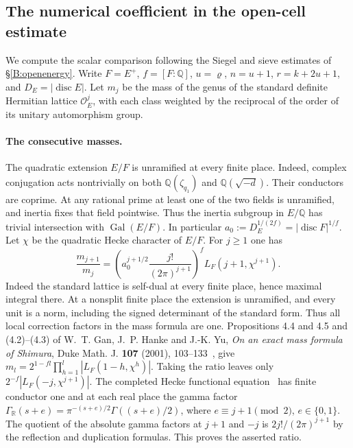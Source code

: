 \subsection{The numerical coefficient in the open-cell estimate}
\label{spread:normalization}
We compute the scalar comparison following the Siegel and sieve estimates of
\S\ref{B:openenergy}.  Write \(F=E^+\), \(f=[F:\mathbb Q]\),
\(u=\varrho\), \(n=u+1\), \(r=k+2u+1\), and \(D_E=|\operatorname{disc}E|\).
Let \(m_j\) be the mass of the genus of the standard definite
Hermitian lattice \(\mathcal O_E^j\), with each class weighted by the
reciprocal of the order of its unitary automorphism group.

\paragraph{The consecutive masses.}
The quadratic extension \(E/F\) is unramified at every finite place.
Indeed, complex conjugation acts nontrivially on both
\(\mathbb Q(\zeta_{q_1})\) and \(\mathbb Q(\sqrt{-d})\). Their
conductors are coprime. At any rational prime at least one of the two
fields is unramified, and inertia fixes that field pointwise. Thus the
inertia subgroup in \(E/\mathbb Q\) has trivial intersection with
\(\operatorname{Gal}(E/F)\). In particular
\(a_0:=D_E^{1/(2f)}=|\operatorname{disc}F|^{1/f}\).
Let \(\chi\) be the quadratic Hecke character of \(E/F\).
For \(j\ge1\) one has
\[
 \frac{m_{j+1}}{m_j}
 =\left(a_0^{j+1/2}\frac{j!}{(2\pi)^{j+1}}\right)^f
   L_F(j+1,\chi^{j+1}).
\]
Indeed the standard lattice is self-dual at every finite place, hence
maximal integral there. At a nonsplit finite place the extension is
unramified, and every unit is a norm, including the signed determinant
of the standard form. Thus all local correction factors in the mass
formula are one. Propositions 4.4 and 4.5 and (4.2)--(4.3) of
W.~T. Gan, J.~P. Hanke and J.-K. Yu, \emph{On an exact mass formula of
Shimura}, Duke Math. J. \textbf{107} (2001), 103--133~\cite{ghy}, give
\(m_l=2^{1-fl}\prod_{h=1}^{l}|L_F(1-h,\chi^h)|\).
Taking the ratio leaves only \(2^{-f}|L_F(-j,\chi^{j+1})|\).
The completed Hecke functional equation~\cite{tate} has finite conductor one and
at each real place the gamma factor
\(\Gamma_{\mathbb R}(s+e)=\pi^{-(s+e)/2}\Gamma((s+e)/2)\),
where \(e\equiv j+1\pmod 2\), \(e\in\{0,1\}\).
The quotient of the absolute gamma factors at \(j+1\) and \(-j\)
is \(2j!/(2\pi)^{j+1}\) by the reflection and duplication
formulas. This proves the asserted ratio.

